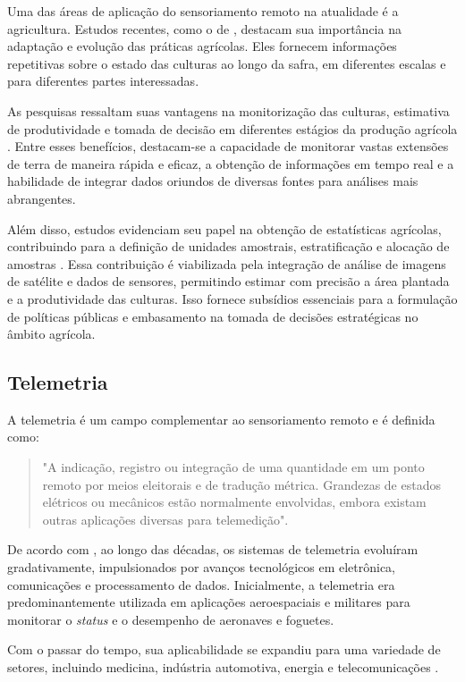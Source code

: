Uma das áreas de aplicação do sensoriamento remoto na atualidade é a agricultura. Estudos recentes, como o de \textcite{weiss2020}, destacam sua importância na adaptação e evolução das práticas agrícolas. Eles fornecem informações repetitivas sobre o estado das culturas ao longo da safra, em diferentes escalas e para diferentes partes interessadas.

As pesquisas ressaltam suas vantagens na monitorização das culturas, estimativa de produtividade e tomada de decisão em diferentes estágios da produção agrícola \parencite{shanmugapriya2019, khanal2020}. Entre esses benefícios, destacam-se a capacidade de monitorar vastas extensões de terra de maneira rápida e eficaz, a obtenção de informações em tempo real e a habilidade de integrar dados oriundos de diversas fontes para análises mais abrangentes.

Além disso, estudos evidenciam seu papel na obtenção de estatísticas agrícolas, contribuindo para a definição de unidades amostrais, estratificação e alocação de amostras \parencite{carfagna2005}. Essa contribuição é viabilizada pela integração de análise de imagens de satélite e dados de sensores, permitindo estimar com precisão a área plantada e a produtividade das culturas. Isso fornece subsídios essenciais para a formulação de políticas públicas e embasamento na tomada de decisões estratégicas no âmbito agrícola.

\subsection{Telemetria}
A telemetria é um campo complementar ao sensoriamento remoto e é definida como:
\begin{quote}
"A indicação, registro ou integração de uma quantidade em um ponto remoto por meios eleitorais e de tradução métrica.  Grandezas de estados elétricos ou mecânicos estão normalmente envolvidas, embora existam outras aplicações diversas para telemedição". \parencite[{p. 3}]{telemetering1941}
\end{quote}

De acordo com \textcite{telemetry_systems2002}, ao longo das décadas, os sistemas de telemetria evoluíram gradativamente, impulsionados por avanços tecnológicos em eletrônica, comunicações e processamento de dados. Inicialmente, a telemetria era predominantemente utilizada em aplicações aeroespaciais e militares para monitorar o \textit{status} e o desempenho de aeronaves e foguetes. 

Com o passar do tempo, sua aplicabilidade se expandiu para uma variedade de setores, incluindo medicina, indústria automotiva, energia e telecomunicações \parencite{Lizhuang_telemetry2021, Hassanien2020, Ding_telemetry2017}.

